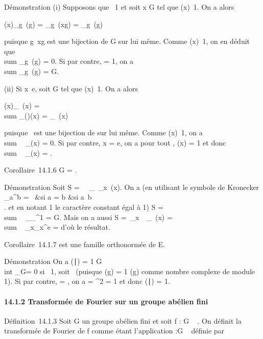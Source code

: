 \documentclass[]{article}
\begin{document}
Démonstration (i) Supposons que \chi\neq~1 et soit x
\in G tel que \chi(x)\neq~1. On a alors

\chi(x)\sum _g\inG~\chi(g) =
\sum _g\inG~\chi(xg) =
\sum _g\inG~\chi(g)

puisque g\mapsto~xg est une bijection de G sur lui
même. Comme \chi(x)\neq~1, on en déduit que
\\sum  _g\inG~\chi(g)
= 0. Si par contre, \chi = 1, on a
\\sum  _g\inG~\chi(g)
= G.

(ii) Si x\neq~e, soit \phi \in\hat
G tel que \phi(x)\neq~1. On a alors

\phi(x)\sum _\chi\in\hatG~\chi(x)
= \\sum
_\chi\in\hatG(\phi\chi)(x) =
\sum _\chi\in\hatG~\chi(x)

puisque \chi\mapsto~\phi\chi est une bijection de
\hatG sur lui même. Comme
\phi(x)\neq~1, on a
\\sum ~
_\chi\in\hatG\chi(x) = 0. Si par contre, x = e, on a
pour tout \chi, \chi(x) = 1 et donc
\\sum ~
_\chi\in\hatG\chi(x) =
\hatG.

Corollaire~14.1.6 G =
\hatG.

Démonstration Soit S =\
\sum ~
_\chi\in\hatG\
\sum  _x\inG~\chi(x). On a (en utilisant le
symbole de Kronecker \delta_a^b = \left
\ \cases 1&si a = b
&si a\neq~b\\ 
\right . et en notant 1 le caractère constant égal à 1) S
= \\sum ~
_\chi\in\hatGG\delta_\chi^1
= G. Mais on a aussi S =\
\sum  _x\inG~\
\sum  _\chi\in\hatG~\chi(x)
= \\sum ~
_x\inG\hatG\delta_x^e
= \hatG d'où le résultat.

Corollaire~14.1.7 \hatG est une famille orthonormée
de E.

Démonstration On a (\chi∣\phi) = 1
\over G \\int
 _G\overline\chi\phi = 0 si
\overline\chi\phi\neq~1, soit
\chi\neq~\phi (puisque \overline\chi(g)
= 1 \over \chi(g) comme nombre complexe de module 1). Si
par contre, \chi = \phi, on a \overline\chi\phi =
\chi^2 = 1 et donc
(\chi∣\phi) = 1.

\paragraph{14.1.2 Transformée de Fourier sur un groupe abélien fini}

Définition~14.1.3 Soit G un groupe abélien fini et soit f : G \rightarrow~ . On
définit la transformée de Fourier de f comme étant l'application
\hatf :\hat G \rightarrow~ \mathbb{C} définie par
\end{document}

